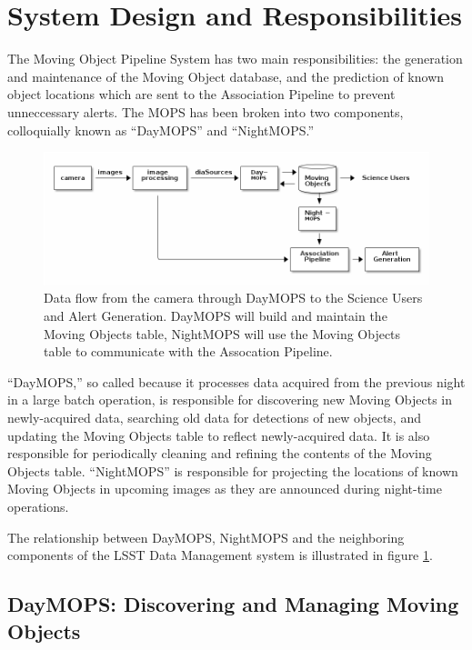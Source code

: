 \section{System Design and Responsibilities}

The Moving Object Pipeline System has two main responsibilities: the
generation and maintenance of the Moving Object database, and the
prediction of known object locations which are sent to the Association
Pipeline to prevent unneccessary alerts.  The MOPS has been broken
into two components, colloquially known as ``DayMOPS'' and ``NightMOPS.''
 

\begin{figure}[!ht]
\centering
  \includegraphics[width=13cm]{illustrations/mopsWithinLsst.png}
\caption{ Data flow from the camera through DayMOPS to the Science
  Users and Alert Generation.  DayMOPS will build and maintain the
  Moving Objects table, NightMOPS will use the Moving Objects table to
  communicate with the Assocation Pipeline.  }
\label{mopsWithinLsst}
\end{figure}


``DayMOPS,'' so called because it processes data acquired from the
previous night in a large batch operation, is responsible for
discovering new Moving Objects in newly-acquired data, searching old
data for detections of new objects, and updating the Moving Objects
table to reflect newly-acquired data. It is also responsible for
periodically cleaning and refining the contents of the Moving Objects
table.  ``NightMOPS'' is responsible for projecting the locations of known
Moving Objects in upcoming images as they are announced during
night-time operations.  

The relationship between DayMOPS, NightMOPS and the neighboring
components of the LSST Data Management system is illustrated in
figure \ref{mopsWithinLsst}.

\subsection{DayMOPS: Discovering and Managing Moving Objects}

